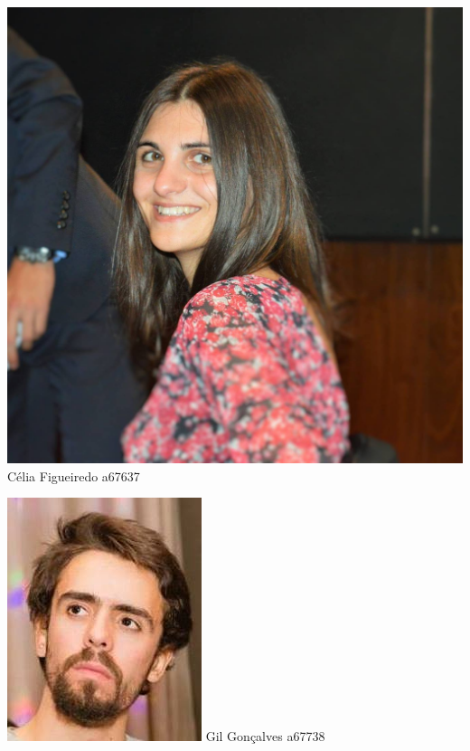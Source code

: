 \begin{titlepage}
\begin{center}
\noindent\begin{minipage}[b]{.1\textwidth}
	\includegraphics[scale=0.070]{celia}
	\small{Célia Figueiredo a67637}
\end{minipage} 
\hfill
\begin{minipage}[b]{.1\textwidth}
	\includegraphics[scale=0.36]{gil}
	\small{Gil Gonçalves a67738}
\end{minipage}
\hfill
\begin{minipage}[b]{.1\textwidth}

\end{minipage}
\end{center}
\end{titlepage}
